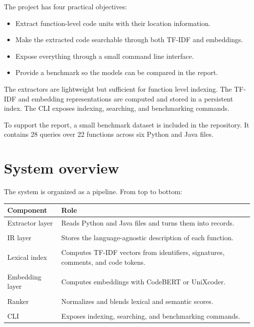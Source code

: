 \documentclass[12pt]{article}
\begin{document}
The project has four practical objectives:

\begin{itemize}
  \item Extract function-level code units with their location information.
  \item Make the extracted code searchable through both TF-IDF and embeddings.
  \item Expose everything through a small command line interface.
  \item Provide a benchmark so the models can be compared in the report.
\end{itemize}

The extractors are lightweight but sufficient for function level indexing.
The TF-IDF and embedding representations are computed and stored in a persistent index.
The CLI exposes indexing, searching, and benchmarking commands.

To support the report, a small benchmark dataset is included in the repository.
It contains 28 queries over 22 functions across six Python and Java files.

\section{System overview}
\label{sec:overview}

The system is organized as a pipeline. From top to bottom:

\noindent

\begin{center}
  \begin{tabular}{>{\raggedright\arraybackslash}p{1.8in} >{\raggedright\arraybackslash}p{3.4in}}
    \toprule
    Component & Role \\
    \midrule
    Extractor layer & Reads Python and Java files and turns them into records. \\
    \\
    IR layer & Stores the language-agnostic description of each function. \\
    \\
    Lexical index & Computes TF-IDF vectors from identifiers, signatures, comments, and code tokens. \\
    \\
    Embedding layer & Computes embeddings with CodeBERT or UniXcoder. \\
    \\
    Ranker & Normalizes and blends lexical and semantic scores. \\
    \\
    CLI & Exposes indexing, searching, and benchmarking commands. \\
    \bottomrule
  \end{tabular}
\end{center}
\end{document}
